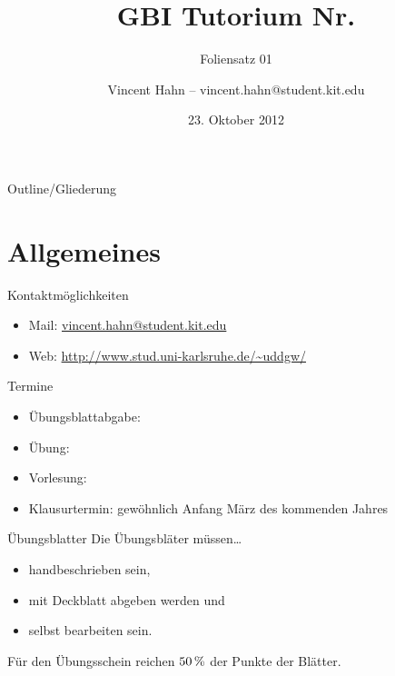 \documentclass[18pt]{beamer}
\title[GBI Tutorium]{GBI Tutorium Nr. }
\subtitle{Foliensatz 01}
\date{23. Oktober 2012}
\author{Vincent Hahn -- vincent.hahn@student.kit.edu}
\institute{Institut für theoretische Informatik}
\begin{document}

\begin{frame}
\titlepage
\end{frame}

\begin{frame}{Outline/Gliederung}
\tableofcontents
\end{frame}

\section{Allgemeines}
\begin{frame}{Kontaktmöglichkeiten}
\begin{itemize}
    \item Mail: \href{mailto:vincent.hahn@student.kit.edu}{vincent.hahn@student.kit.edu}
\pause
    \item Web: \url{http://www.stud.uni-karlsruhe.de/~uddgw/}
\end{itemize}
\end{frame}

\begin{frame}{Termine}
    \begin{itemize}
    \item Übungsblattabgabe:
    \pause
    \item Übung: 
    \item Vorlesung: 
    \pause
    \item Klausurtermin: gewöhnlich Anfang März des kommenden Jahres
    \end{itemize}
\end{frame}

\begin{frame}{Übungsblatter}
    Die Übungsbläter müssen\dots
    \begin{itemize}
        \item handbeschrieben sein,
        \item mit Deckblatt abgeben werden und
        \item selbst bearbeiten sein.
    \end{itemize}
    Für den Übungsschein reichen $\unit[50]{\%}$ der Punkte der Blätter.
\end{frame}
\end{document}
